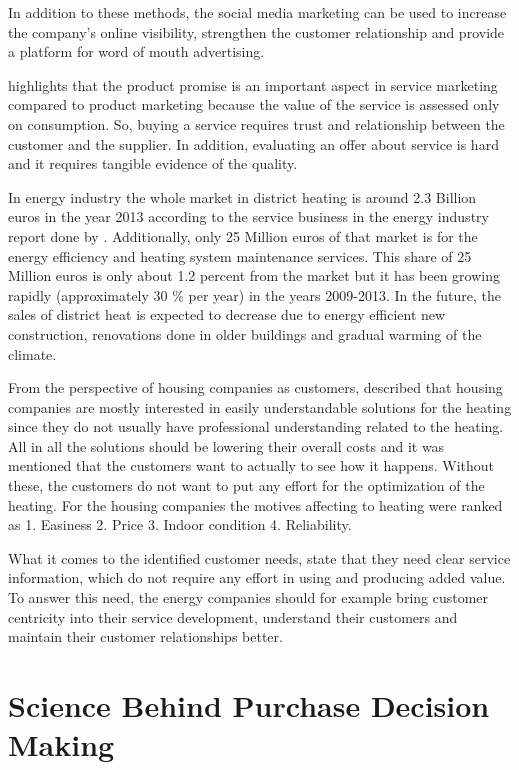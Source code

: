 In addition to these methods, the social media marketing can be used to increase the company's online visibility, strengthen the customer relationship and provide a platform for word of mouth advertising. \parencite{SocialMediaMarketing:2017}

\textcite{MarketingPlans:2016} highlights that the product promise is an important aspect in service marketing compared to product marketing because the value of the service is assessed only on consumption. So, buying a service requires trust and relationship between the customer and the supplier. In addition, evaluating an offer about service is hard and it requires tangible evidence of the quality.

In energy industry the whole market in district heating is around 2.3 Billion euros in the year 2013 according to the service business in the energy industry report done by \textcite{EnergyServiceBusiness:2015}. Additionally, only 25 Million euros of that market is for the energy efficiency and heating system maintenance services. This share of 25 Million euros is only about 1.2 percent from the market but it has been growing rapidly (approximately 30 \% per year) in the years 2009-2013. In the future, the sales of district heat is expected to decrease due to energy efficient new construction, renovations done in older buildings and gradual warming of the climate.

From the perspective of housing companies as customers, \textcite{Deloitte} described that housing companies are mostly interested in easily understandable solutions for the heating since they do not usually have professional understanding related to the heating. All in all the solutions should be lowering their overall costs and it was mentioned that the customers want to actually to see how it happens. Without these, the customers do not want to put any effort for the optimization of the heating. For the housing companies the motives affecting to heating were ranked as 1. Easiness 2. Price 3. Indoor condition 4. Reliability.

What it comes to the identified customer needs, \textcite{Deloitte} state that they need clear service information, which do not require any effort in using and producing added value. To answer this need, the energy companies should for example bring customer centricity into their service development, understand their customers and maintain their customer relationships better.

\section{Science Behind Purchase Decision Making}

